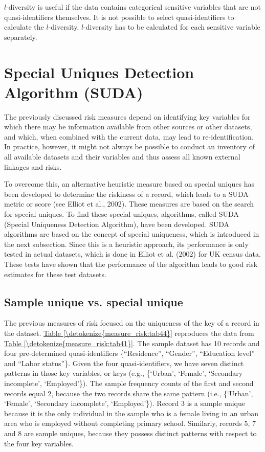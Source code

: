 \documentclass[letterpaper,10pt,english]{sphinxmanual}
\begin{document}
\(l\)-diversity is useful if the data contains categorical sensitive
variables that are not quasi-identifiers themselves. It is not possible
to select quasi-identifiers to calculate the \(l\)-diversity.
\(l\)-diversity has to be calculated for each sensitive variable
separately.


\section{Special Uniques Detection Algorithm (SUDA)}
\label{\detokenize{measure_risk:special-uniques-detection-algorithm-suda}}
The previously discussed risk measures depend on identifying key
variables for which there may be information available from other
sources or other datasets, and which, when combined with the current
data, may lead to re-identification. In practice, however, it might not
always be possible to conduct an inventory of all available datasets and
their variables and thus assess all known external linkages and risks.

To overcome this, an alternative heuristic measure based on special
uniques has been developed to determine the riskiness of a record, which
leads to a SUDA metric or score (see Elliot et al., 2002). These
measures are based on the search for special uniques. To find these
special uniques, algorithms, called SUDA (Special Uniqueness Detection
Algorithm), have been developed. SUDA algorithms are based on the
concept of special uniqueness, which is introduced in the next
subsection. Since this is a heuristic approach, its performance is only
tested in actual datasets, which is done in Elliot et al. (2002) for UK
census data. These tests have shown that the performance of the
algorithm leads to good risk estimates for these test datasets.


\subsection{Sample unique vs. special unique}
\label{\detokenize{measure_risk:sample-unique-vs-special-unique}}
The previous measures of risk focused on the uniqueness of the key of a
record in the dataset. \hyperref[\detokenize{measure_risk:tab44}]{Table \ref{\detokenize{measure_risk:tab44}}} reproduces the data from \hyperref[\detokenize{measure_risk:tab41}]{Table \ref{\detokenize{measure_risk:tab41}}}. The
sample dataset has 10 records and four pre-determined quasi-identifiers
\{“Residence”, “Gender”, “Education level” and “Labor status”\}. Given the
four quasi-identifiers, we have seven distinct patterns in those key
variables, or keys (e.g., \{‘Urban’, ‘Female’, ‘Secondary incomplete’,
‘Employed’\}). The sample frequency counts of the first and second
records equal 2, because the two records share the same pattern (i.e.,
\{‘Urban’, ‘Female’, ‘Secondary incomplete’, ‘Employed’\}). Record 3 is a
sample unique because it is the only individual in the sample who is a
female living in an urban area who is employed without completing
primary school. Similarly, records 5, 7 and 8 are sample uniques,
because they possess distinct patterns with respect to the four key
variables.
\end{document}

